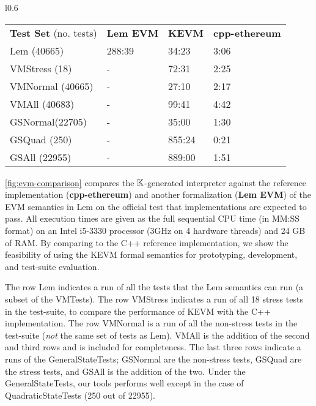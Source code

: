 \begin{wrapfigure}{l}{0.6\textwidth}
      \begin{tabular}{ l l l l }
          \textbf{Test Set} (no. tests) & \textbf{Lem EVM} & \textbf{KEVM} & \textbf{cpp-ethereum} \\
          Lem (40665)                   & 288:39           & 34:23         & 3:06                  \\
          VMStress (18)                 & -                & 72:31         & 2:25                  \\
          VMNormal (40665)              & -                & 27:10         & 2:17                  \\
          VMAll (40683)                 & -                & 99:41         & 4:42                  \\
          GSNormal(22705)               & -                & 35:00         & 1:30                  \\
          GSQuad (250)                  & -                & 855:24        & 0:21                  \\
          GSAll (22955)                 & -                & 889:00        & 1:51                  \\
      \end{tabular}
  \caption{Lem EVM vs KEVM vs cpp-ethereum}\label{fig:evm-comparison}
\end{wrapfigure}
\figurename{} \ref{fig:evm-comparison} compares the $\mathbb{K}{}$-generated interpreter
against the reference implementation (\textbf{cpp-ethereum}) and
another formalization (\textbf{Lem EVM}) of the EVM semantics \cite{HiraiWSTC17} in Lem \cite{MulliganACM14}
on the official test that implementations are expected to pass.
All execution times are given as the full sequential CPU time (in MM:SS format) on an Intel i5-3330 processor (3GHz on 4 hardware threads) and 24 GB of RAM.
By comparing to the C++ reference implementation, we show the feasibility of using the KEVM formal semantics for prototyping, development, and test-suite evaluation.

The row Lem indicates a run of all the tests that the Lem semantics can run (a subset of the VMTests).
The row VMStress indicates a run of all 18 stress tests in the test-suite, to compare the performance of KEVM with the C++ implementation.
The row VMNormal is a run of all the non-stress tests in the test-suite (\textit{not} the same set of tests as Lem).
VMAll is the addition of the second and third rows and is included for completeness.
The last three rows indicate a runs of the GeneralStateTests; GSNormal are the non-stress tests, GSQuad are the stress tests, and GSAll is the addition of the two.
Under the GeneralStateTests, our tools performs well except in the case of QuadraticStateTests (250 out of 22955).

